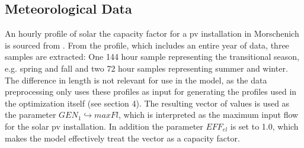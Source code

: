 \documentclass[
	11pt,								%
	DIV10,								%
	a4paper,         					%
	oneside,							%
	headheight=20pt,					%
	footheight=20pt,					%
    parskip=full,						%
    listof=totoc,						%
	bibliography=totoc,					%
	index=totoc,						%
]{scrartcl}
\begin{document}
\subsection{Meteorological Data}
An hourly profile of solar the capacity factor for a pv installation in Morschenich is sourced from \cite{pfenningerLongtermPatternsEuropean2016}. From the profile, which includes an entire year of data, three samples are extracted: One 144 hour sample representing the transitional season, e.g. spring and fall and two 72 hour samples representing summer and winter. The difference in length is not relevant for use in the model, as the data preprocessing only uses these profiles as input for generating the profiles used in the optimization itself (see section 4). The resulting vector of values is used as the parameter $GEN_1 \hookrightarrow maxFl$, which is interpreted as the maximum input flow for the solar pv installation. In addition the parameter $EFF_{el}$ is set to 1.0, which makes the model effectively treat the vector as a capacity factor.
\end{document}
